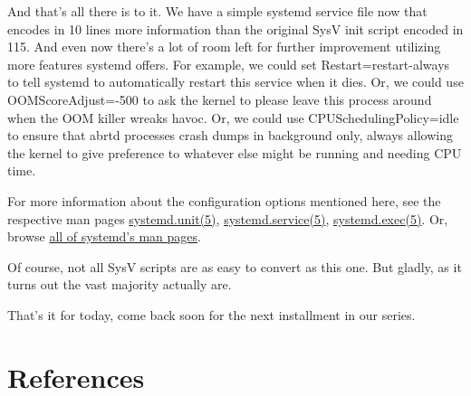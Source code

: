 \documentclass[titlepage]{article}
\begin{document}
And that's all there is to it. We have a simple systemd service file now that encodes in 10 lines more information than the original SysV init script encoded in 115. And even now there's a lot of room left for further improvement utilizing more features systemd offers. For example, we could set Restart=restart-always to tell systemd to automatically restart this service when it dies. Or, we could use OOMScoreAdjust=-500 to ask the kernel to please leave this process around when the OOM killer wreaks havoc. Or, we could use CPUSchedulingPolicy=idle to ensure that abrtd processes crash dumps in background only, always allowing the kernel to give preference to whatever else might be running and needing CPU time.

For more information about the configuration options mentioned here, see the respective man pages \href{https://0pointer.de/public/systemd-man/systemd.unit.html}{systemd.unit(5)}, \href{https://0pointer.de/public/systemd-man/systemd.service.html}{systemd.service(5)}, \href{https://0pointer.de/public/systemd-man/systemd.exec.html}{systemd.exec(5)}. Or, browse \href{https://0pointer.de/public/systemd-man/}{all of systemd's man pages}.

Of course, not all SysV scripts are as easy to convert as this one. But gladly, as it turns out the vast majority actually are.

That's it for today, come back soon for the next installment in our series.
\section{References}
\nocite{*}


\end{document}
